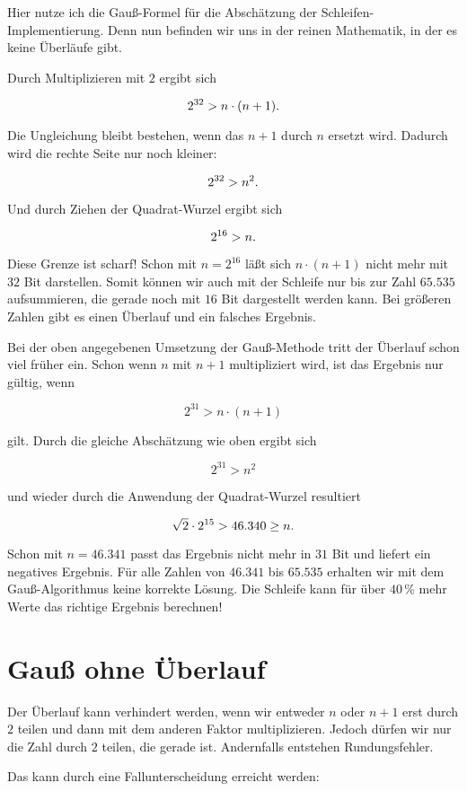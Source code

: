 \noindent Hier nutze ich die Gauß-Formel für die Abschätzung der
Schleifen-Implementierung.
Denn nun befinden wir uns in der reinen Mathematik, in der es keine
Überläufe gibt.

Durch Multiplizieren mit $2$ ergibt sich

$$2^{32} > n\cdot(n+1)\hbox{.}$$

\noindent Die Ungleichung bleibt bestehen, wenn das $n+1$ durch $n$
ersetzt wird. Dadurch wird die rechte Seite nur noch kleiner:

$$2^{32} > n^2\hbox{.}$$

\noindent Und durch Ziehen der Quadrat-Wurzel ergibt sich

$$2^{16} > n\hbox{.}$$

\noindent Diese Grenze ist scharf! Schon mit $n=2^{16}$ läßt sich
$n\cdot(n+1)$ nicht mehr mit $32$ Bit darstellen.
Somit können wir auch mit der Schleife nur bis zur Zahl $65.535$
aufsummieren, die gerade noch mit $16$ Bit dargestellt werden kann.
Bei größeren Zahlen gibt es einen Überlauf und ein falsches Ergebnis.

Bei der oben angegebenen Umsetzung der Gauß-Methode tritt der
Überlauf schon viel früher ein.
Schon wenn $n$ mit $n+1$ multipliziert wird, ist das Ergebnis nur gültig,
wenn

$$2^{31}>n\cdot(n+1)$$

\noindent gilt.
Durch die gleiche Abschätzung wie oben ergibt sich

$$2^{31}>n^2$$

\noindent und wieder durch die Anwendung der Quadrat-Wurzel resultiert

$$\sqrt{2}\cdot2^{15}>46.340\geq n\hbox{.}$$

\noindent Schon mit $n=46.341$ passt das Ergebnis nicht mehr in $31$ Bit und liefert
ein negatives Ergebnis.
Für alle Zahlen von $46.341$ bis $65.535$ erhalten wir mit dem
Gauß-Algorithmus keine korrekte Lösung.
Die Schleife kann für über $40\,\%$ mehr Werte das richtige Ergebnis
berechnen!

\section{Gauß ohne Überlauf}%
%
Der Überlauf kann verhindert werden, wenn wir entweder $n$ oder
$n+1$ erst durch $2$ teilen und dann mit dem anderen Faktor
multiplizieren.
Jedoch dürfen wir nur die Zahl durch $2$ teilen, die gerade
ist.
Andernfalls entstehen Rundungsfehler.

Das kann durch eine Fallunterscheidung erreicht werden:

